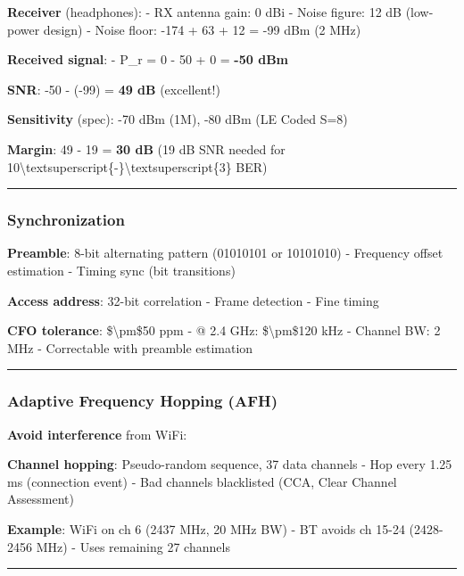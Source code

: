 \textbf{Receiver} (headphones): - RX antenna gain: 0 dBi - Noise figure:
12 dB (low-power design) - Noise floor: -174 + 63 + 12 = -99 dBm (2 MHz)

\textbf{Received signal}: - P\_r = 0 - 50 + 0 = \textbf{-50 dBm}

\textbf{SNR}: -50 - (-99) = \textbf{49 dB} (excellent!)

\textbf{Sensitivity} (spec): -70 dBm (1M), -80 dBm (LE Coded S=8)

\textbf{Margin}: 49 - 19 = \textbf{30 dB} (19 dB SNR needed for
10\textbackslash textsuperscript\{-\}\textbackslash textsuperscript\{3\}
BER)

\begin{center}\rule{0.5\linewidth}{0.5pt}\end{center}

\subsubsection{Synchronization}\label{synchronization-2}

\textbf{Preamble}: 8-bit alternating pattern (01010101 or 10101010) -
Frequency offset estimation - Timing sync (bit transitions)

\textbf{Access address}: 32-bit correlation - Frame detection - Fine
timing

\textbf{CFO tolerance}: \$\textbackslash pm\$50 ppm - @ 2.4 GHz:
\$\textbackslash pm\$120 kHz - Channel BW: 2 MHz - Correctable with
preamble estimation

\begin{center}\rule{0.5\linewidth}{0.5pt}\end{center}

\subsubsection{Adaptive Frequency Hopping
(AFH)}\label{adaptive-frequency-hopping-afh}

\textbf{Avoid interference} from WiFi:

\textbf{Channel hopping}: Pseudo-random sequence, 37 data channels - Hop
every 1.25 ms (connection event) - Bad channels blacklisted (CCA, Clear
Channel Assessment)

\textbf{Example}: WiFi on ch 6 (2437 MHz, 20 MHz BW) - BT avoids ch
15-24 (2428-2456 MHz) - Uses remaining 27 channels

\begin{center}\rule{0.5\linewidth}{0.5pt}\end{center}

